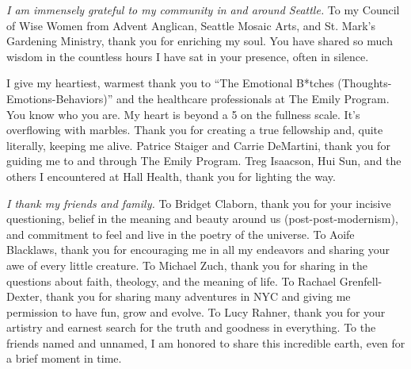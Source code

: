 \textit{I am immensely grateful to my community in and around Seattle.} To my
Council of Wise Women from Advent Anglican, Seattle Mosaic Arts, and St. Mark's
Gardening Ministry, thank you for enriching my soul. You have shared so much
wisdom in the countless hours I have sat in your presence, often in silence.

I give my heartiest, warmest thank you to ``The Emotional B*tches
(Thoughts-Emotions-Behaviors)'' and the healthcare professionals at The Emily Program. You know who you are. 
My heart is beyond a 5 on the fullness scale. It's overflowing with marbles.
Thank you for creating a true fellowship and, quite literally, keeping me
alive. Patrice Staiger and Carrie DeMartini, thank you for guiding me to and
through The Emily Program. Treg Isaacson, Hui Sun, and the others I
encountered at Hall Health, thank you for lighting the way.

\textit{I thank my friends and family.} To Bridget Claborn, thank you for your
incisive questioning, belief in the meaning and beauty around us
(post-post-modernism), and commitment to feel and live in the poetry of the
universe. To Aoife Blacklaws, thank you for encouraging me in all my
endeavors and sharing your awe of every little creature. To Michael Zuch,
thank you for sharing in the questions about faith, theology, and the
meaning of life. To Rachael Grenfell-Dexter, thank you for sharing many
adventures in NYC and giving me permission to have fun, grow and evolve. To
Lucy Rahner, thank you for your artistry and earnest search for the truth
and goodness in everything. To the friends named and unnamed, I am honored
to share this incredible earth, even for a brief moment in time. %

